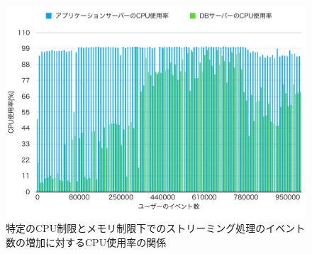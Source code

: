 \documentclass[../../../../../main]{subfiles}
\begin{document}
    \begin{figure}[H]
        \centering
        \includegraphics[width=12cm]{graph}
        \caption{特定のCPU制限とメモリ制限下でのストリーミング処理のイベント数の増加に対するCPU使用率の関係}
        \label{fig:stream-cpu-app_1_1024-db_1_1024}
    \end{figure}
\end{document}
